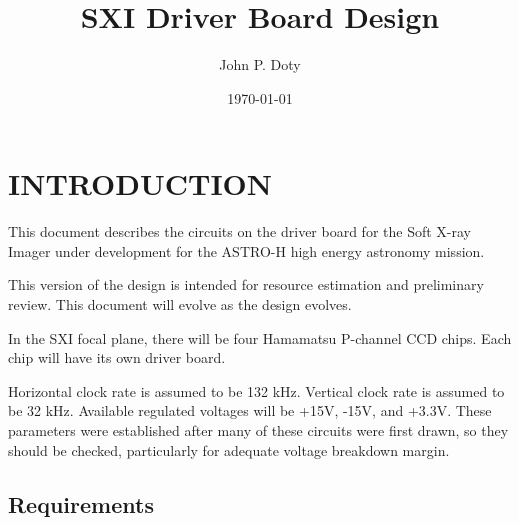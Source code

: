 \documentclass[a4paper,12pt]{article}
\author{John P. Doty}
\date{\today}
\title{SXI Driver Board Design}
\begin{document}
\begin{titlepage}
\maketitle
\end{titlepage} 

\section{INTRODUCTION}
This document describes the circuits on the driver board for the Soft X-ray Imager under development for the ASTRO-H high energy astronomy mission.

This version of the design is intended for resource estimation and preliminary review. This document will evolve as the design evolves.

In the SXI focal plane, there will be four Hamamatsu P-channel CCD chips. Each chip will have its own driver board. 

Horizontal clock rate is assumed to be 132 kHz. Vertical clock rate is assumed to be 32 kHz. Available regulated voltages will be +15V, -15V, and +3.3V. These parameters were established after many of these circuits were first drawn, so they should be checked, particularly for adequate voltage breakdown margin.

\subsection{Requirements}




\end{document}
